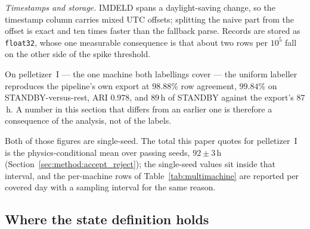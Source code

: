 \emph{Timestamps and storage.} IMDELD spans a daylight-saving change, so
the timestamp column carries mixed UTC offsets; splitting the naive part
from the offset is exact and ten times faster than the fallback parse.
Records are stored as \texttt{float32}, whose one measurable consequence
is that about two rows per $10^{5}$ fall on the other side of the
spike threshold.

On pelletizer~I --- the one machine both labellings cover --- the
uniform labeller reproduces the pipeline's own export at $98.88\%$ row
agreement, $99.84\%$ on STANDBY-versus-rest, ARI $0.978$, and $89$\,h of
STANDBY against the export's $87$\,h. A number in this section that
differs from an earlier one is therefore a consequence of the analysis,
not of the labels.

Both of those figures are single-seed. The total this paper quotes for
pelletizer~I is the physics-conditional mean over passing seeds,
$92\pm3$\,h (Section~\ref{sec:method:accept_reject}); the single-seed
values sit inside that interval, and the per-machine rows of
Table~\ref{tab:multimachine} are reported per covered day with a
sampling interval for the same reason.

\subsection{Where the state definition holds}
\label{sec:multimachine:states}

